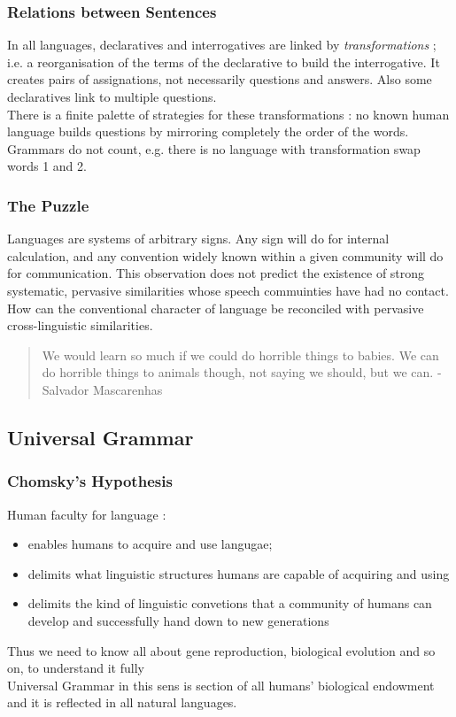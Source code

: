 \documentclass{cours}
\begin{document}
\subsubsection{Relations between Sentences}
In all languages, declaratives and interrogatives are linked by \emph{transformations} ; i.e. a reorganisation of the terms of the declarative to build the interrogative. It creates pairs of assignations, not necessarily questions and answers. Also some declaratives link to multiple questions. \\
There is a finite palette of strategies for these transformations\! : no known human language builds questions by mirroring completely the order of the words. Grammars do not count, e.g. there is no language with transformation swap words 1 and 2.\\

\subsubsection{The Puzzle}
Languages are systems of arbitrary signs. Any sign will do for internal calculation, and any convention widely known within a given community will do for communication. This observation does not predict the existence of strong systematic, pervasive similarities whose speech commuinties have had no contact. \\
How can the conventional character of language be reconciled with pervasive cross-linguistic similarities. 
\begin{quote}
    We would learn so much if we could do horrible things to babies. We can do horrible things to animals though, not saying we should, but we can.   - Salvador Mascarenhas
\end{quote}

\subsection{Universal Grammar}
\subsubsection{Chomsky's Hypothesis}
Human faculty for language\! : \begin{itemize}
    \item enables humans to acquire and use langugae;
    \item delimits what linguistic structures humans are capable of acquiring and using
    \item delimits the kind of linguistic convetions that a community of humans can develop and successfully hand down to new generations
\end{itemize}
Thus we need to know all about gene reproduction, biological evolution and so on, to understand it fully \\
Universal Grammar in this sens is section of all humans' biological endowment and it is reflected in all natural languages.
\end{document}
